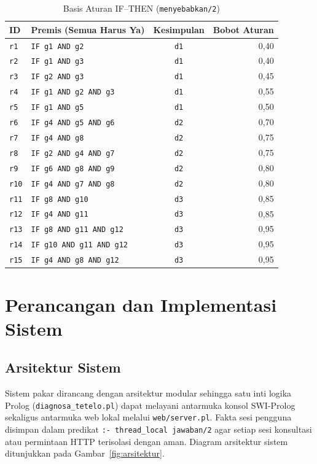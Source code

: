 \documentclass[12pt,a4paper]{report}
\begin{document}
\begin{table}[H]
\centering
\caption{Basis Aturan IF--THEN (\texttt{menyebabkan/2})}
\label{tab:aturan}
\small
\begin{tabularx}{\textwidth}{l Y c r}
\toprule
\textbf{ID} & \textbf{Premis (Semua Harus Ya)} & \textbf{Kesimpulan} & \textbf{Bobot Aturan} \\
\midrule
\texttt{r1}  & \texttt{IF g1 AND g2} & \texttt{d1} & 0,40 \\
\texttt{r2}  & \texttt{IF g1 AND g3} & \texttt{d1} & 0,40 \\
\texttt{r3}  & \texttt{IF g2 AND g3} & \texttt{d1} & 0,45 \\
\texttt{r4}  & \texttt{IF g1 AND g2 AND g3} & \texttt{d1} & 0,55 \\
\texttt{r5}  & \texttt{IF g1 AND g5} & \texttt{d1} & 0,50 \\
\midrule
\texttt{r6}  & \texttt{IF g4 AND g5 AND g6} & \texttt{d2} & 0,70 \\
\texttt{r7}  & \texttt{IF g4 AND g8} & \texttt{d2} & 0,75 \\
\texttt{r8}  & \texttt{IF g2 AND g4 AND g7} & \texttt{d2} & 0,75 \\
\texttt{r9}  & \texttt{IF g6 AND g8 AND g9} & \texttt{d2} & 0,80 \\
\texttt{r10} & \texttt{IF g4 AND g7 AND g8} & \texttt{d2} & 0,80 \\
\midrule
\texttt{r11} & \texttt{IF g8 AND g10} & \texttt{d3} & 0,85 \\
\texttt{r12} & \texttt{IF g4 AND g11} & \texttt{d3} & 0,85 \\
\texttt{r13} & \texttt{IF g8 AND g11 AND g12} & \texttt{d3} & 0,95 \\
\texttt{r14} & \texttt{IF g10 AND g11 AND g12} & \texttt{d3} & 0,95 \\
\texttt{r15} & \texttt{IF g4 AND g8 AND g12} & \texttt{d3} & 0,95 \\
\bottomrule
\end{tabularx}
\end{table}

\chapter{Perancangan dan Implementasi Sistem}

\section{Arsitektur Sistem}
Sistem pakar dirancang dengan arsitektur modular sehingga satu inti logika Prolog (\texttt{diagnosa\_tetelo.pl}) dapat melayani antarmuka konsol SWI-Prolog sekaligus antarmuka web lokal melalui \texttt{web/server.pl}. Fakta sesi pengguna disimpan dalam predikat \texttt{:- thread\_local jawaban/2} agar setiap sesi konsultasi atau permintaan HTTP terisolasi dengan aman. Diagram arsitektur sistem ditunjukkan pada Gambar~\ref{fig:arsitektur}.
\end{document}
